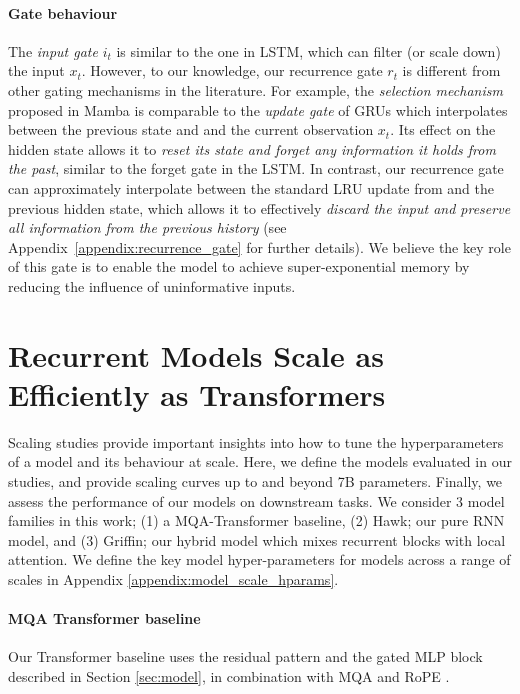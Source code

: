 \paragraph{Gate behaviour}

The \emph{input gate} $i_t$ is similar to the one in LSTM, which can filter (or scale down) the input $x_t$. However, to our knowledge, our recurrence gate $r_t$ is different from other gating mechanisms in the literature. For example, the \emph{selection mechanism} proposed in Mamba  \citep{gu2023mamba} is comparable to the \emph{update gate} of GRUs which interpolates between the previous state and and the current observation $x_t$. Its effect on the hidden state allows it to \emph{reset its state and forget any information it holds from the past}, similar to the forget gate in the LSTM. In contrast, our recurrence gate can approximately interpolate between the standard LRU update from \citet{orvieto2023universality} and the previous hidden state, which allows it to effectively \emph{discard the input and preserve all information from the previous history} (see Appendix~\ref{appendix:recurrence_gate} for further details). We believe the key role of this gate is to enable the model to achieve super-exponential memory by reducing the influence of uninformative inputs.

\section{Recurrent Models Scale as Efficiently as Transformers}
\label{sec:scaling_new}
Scaling studies provide important insights into how to tune the hyperparameters of a model and its behaviour at scale. Here, we define the models evaluated in our studies, and provide scaling curves up to and beyond 7B parameters. Finally, we assess the performance of our models on downstream tasks. We consider 3 model families in this work; (1) a MQA-Transformer baseline, (2) Hawk; our pure RNN model, and (3) Griffin; our hybrid model which mixes recurrent blocks with local attention.  We define the key model hyper-parameters for models across a range of scales in Appendix \ref{appendix:model_scale_hparams}. 

\paragraph{MQA Transformer baseline}
\label{sec:MQA-Transformer-baseline}

Our Transformer baseline uses the residual pattern and the gated MLP block described in Section \ref{sec:model}, in combination with MQA \citep{shazeer2019fast} and RoPE \citep{su2021roformer}.

